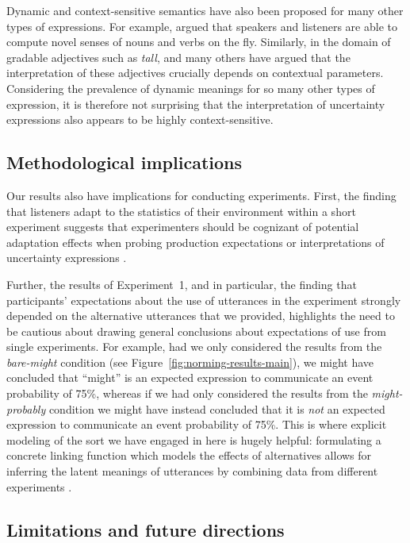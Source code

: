 \documentclass[man, floatsintext]{apa6}
\newcommand{\figref}[1]{Figure~\ref{#1}}
\begin{document}
Dynamic and context-sensitive semantics have also been proposed for many other types of expressions.
For example, \textcite{Clark1983} argued that speakers and listeners
are able to compute novel senses of nouns and verbs on the fly. Similarly, in the domain of gradable adjectives such as \textit{tall},
 \textcite{Kennedy2007} and many others have argued that the interpretation of these adjectives crucially depends on contextual
 parameters. Considering the prevalence of dynamic meanings for so many other types of expression, it is therefore not 
 surprising that the interpretation of uncertainty expressions also appears to be highly context-sensitive.
 
\subsection{Methodological implications}

Our results also have implications for conducting experiments. First,
the finding that listeners adapt to the statistics of their environment within a short experiment
suggests that experimenters should be cognizant of potential adaptation effects when probing
production expectations or interpretations of uncertainty expressions \parencite[see also][]{Jaeger2010}. 

Further, the results of Experiment~1, and in particular, the finding
that participants' expectations about the use of utterances in the experiment strongly depended on
the alternative utterances that we provided, highlights the need to be cautious about drawing general conclusions about expectations of use from single experiments. For example,
had we only considered the results from the \textit{bare-might} condition (see \figref{fig:norming-results-main}),
we might have concluded that ``might'' is an expected expression to communicate an event probability of 75\%,
whereas if we had only considered the results from the \textit{might-probably} condition we might have instead concluded that it is \emph{not} an expected expression to communicate an event probability of 75\%.
This is where explicit modeling of the sort we have engaged in here is hugely helpful: formulating a concrete linking function which models the effects of 
alternatives allows for inferring the latent meanings of utterances by combining data from different experiments \parencite[see also][for similar approaches]{Franke2014,Peloquin2016}.

\subsection{Limitations and future directions}
\end{document}

